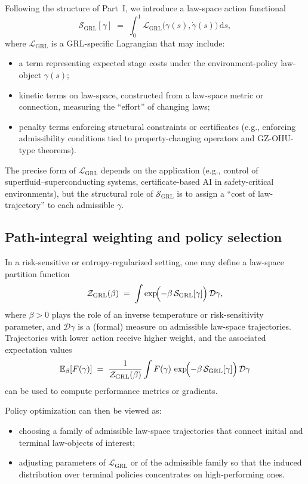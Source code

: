 \documentclass[11pt]{book}
\theoremstyle{plain}
\theoremstyle{definition}
\theoremstyle{remark}
\begin{document}
Following the structure of Part~I, we introduce a law-space action
functional
\[
   \mathcal{S}_{\mathrm{GRL}}[\gamma]
   \;=\;
   \int_0^1 \mathcal{L}_{\mathrm{GRL}}
   \bigl(\gamma(s),\dot{\gamma}(s)\bigr)\,\mathrm{d}s,
\]
where $\mathcal{L}_{\mathrm{GRL}}$ is a GRL-specific Lagrangian that
may include:
\begin{itemize}
  \item a term representing expected stage costs under the
        environment-policy law-object $\gamma(s)$;
  \item kinetic terms on law-space, constructed from a law-space
        metric or connection, measuring the ``effort'' of changing
        laws;
  \item penalty terms enforcing structural constraints or certificates
        (e.g., enforcing admissibility conditions tied to
        property-changing operators and GZ-OHU-type theorems).
\end{itemize}

The precise form of $\mathcal{L}_{\mathrm{GRL}}$ depends on the
application (e.g., control of \\superfluid–superconducting systems,
certificate-based AI in safety-critical environments), but the
structural role of $\mathcal{S}_{\mathrm{GRL}}$ is to assign a
``cost of law-trajectory'' to each admissible $\gamma$.

\subsection*{Path-integral weighting and policy selection}

In a risk-sensitive or entropy-regularized setting, one may define
a law-space partition function
\[
   \mathcal{Z}_{\mathrm{GRL}}(\beta)
   \;=\;
   \int \exp\!\Bigl(-\beta\,
   \mathcal{S}_{\mathrm{GRL}}[\gamma]\Bigr)\,\mathcal{D}\gamma,
\]
where $\beta > 0$ plays the role of an inverse temperature or
risk-sensitivity parameter, and $\mathcal{D}\gamma$ is a (formal)
measure on admissible law-space trajectories. Trajectories with
lower action receive higher weight, and the associated expectation
values
\[
   \mathbb{E}_{\beta}[F(\gamma)]
   \;=\;
   \frac{1}{\mathcal{Z}_{\mathrm{GRL}}(\beta)}
   \int F(\gamma)\,
   \exp\!\Bigl(-\beta\,
   \mathcal{S}_{\mathrm{GRL}}[\gamma]\Bigr)\,\mathcal{D}\gamma
\]
can be used to compute performance metrics or gradients.

Policy optimization can then be viewed as:
\begin{itemize}
  \item choosing a family of admissible law-space trajectories that
        connect initial and terminal law-objects of interest;
  \item adjusting parameters of $\mathcal{L}_{\mathrm{GRL}}$ or of
        the admissible family so that the induced distribution over
        terminal policies concentrates on high-performing ones.
\end{itemize}
\end{document}

